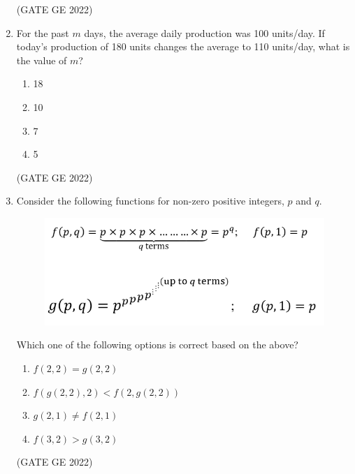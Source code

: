 \documentclass[a4paper, 11pt]{article}
\begin{document}
\begin{enumerate}
\hfill (GATE GE 2022)

\item For the past $m$ days, the average daily production was 100 units/day. If today’s production of 180 units changes the average to 110 units/day, what is the value of $m$?
\begin{enumerate}
    \item 18
    \item 10
    \item 7
    \item 5
\end{enumerate}

\hfill (GATE GE 2022)

\item Consider the following functions for non-zero positive integers, $p$ and $q$.
\begin{figure}[H]
    \centering
    \includegraphics[width=\columnwidth]{figs/fig_8.png}
    \label{fig:placeholder}
\end{figure}
Which one of the following options is correct based on the above?
\begin{enumerate}
    \item $f(2,2) = g(2,2)$
    \item $f(g(2,2), 2) < f(2, g(2,2))$
    \item $g(2,1) \ne f(2,1)$
    \item $f(3,2) > g(3,2)$
\end{enumerate}

\hfill (GATE GE 2022)


\end{enumerate}
\end{document}
